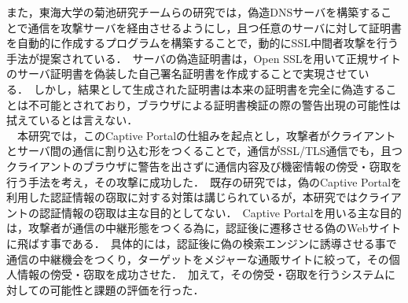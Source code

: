 \documentclass[dvipdfmx,twocolumn]{jsarticle}
\begin{document}
        また，東海大学の菊池研究チームらの研究\cite{FakeSslAndDnsServer}では，偽造DNSサーバを構築することで通信を攻撃サーバを経由させるようにし，且つ任意のサーバに対して証明書を自動的に作成するプログラムを構築することで，動的にSSL中間者攻撃を行う手法が提案されている．\
        サーバの偽造証明書は，Open SSLを用いて正規サイトのサーバ証明書を偽装した自己署名証明書を作成することで実現させている．\
        しかし，結果として生成された証明書は本来の証明書を完全に偽造することは不可能とされており，ブラウザによる証明書検証の際の警告出現の可能性は拭えているとは言えない．\\
        　本研究では，このCaptive Portalの仕組みを起点とし，攻撃者がクライアントとサーバ間の通信に割り込む形をつくることで，通信がSSL/TLS通信でも，且つクライアントのブラウザに警告を出さずに通信内容及び機密情報の傍受・窃取を行う手法を考え，その攻撃に成功した．\
        既存の研究では，偽のCaptive Portalを利用した認証情報の窃取に対する対策は講じられているが，本研究ではクライアントの認証情報の窃取は主な目的としてない．\
        Captive Portalを用いる主な目的は，攻撃者が通信の中継形態をつくる為に，認証後に遷移させる偽のWebサイトに飛ばす事である．\
        具体的には，認証後に偽の検索エンジンに誘導させる事で通信の中継機会をつくり，ターゲットをメジャーな通販サイトに絞って，その個人情報の傍受・窃取を成功させた．\
        加えて，その傍受・窃取を行うシステムに対しての可能性と課題の評価を行った．\
\end{document}
